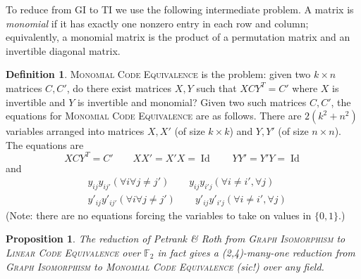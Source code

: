 \documentclass[10pt,a4paper]{article}
\newtheorem{proposition}[theorem]{Proposition}
\theoremstyle{definition}
\newtheorem{definition}[theorem]{Definition}
\DeclareMathOperator{\Id}{Id}
\newcommand{\F}{\mathbb{F}}
\begin{document}
To reduce from \textsc{GI} to \textsc{TI} we use the following intermediate problem. A matrix is \emph{monomial} if it has exactly one nonzero entry in each row and column; equivalently, a monomial matrix is the product of a permutation matrix and an invertible diagonal matrix. 

\begin{definition}
\textsc{Monomial Code Equivalence} is the problem: given two $k \times n$ matrices $C,C'$, do there exist matrices $X,Y$ such that $XCY^T = C'$ where $X$ is invertible and $Y$ is invertible and monomial? Given two such matrices $C,C'$, the equations for \textsc{Monomial Code Equivalence} are as follows. There are $2(k^2 + n^2)$ variables arranged into matrices $X,X'$ (of size $k \times k$) and $Y,Y'$ (of size $n \times n$). The equations are
\[
XCY^T = C' \qquad XX' = X'X =\Id \qquad YY' = Y'Y = \Id
\]
and
\begin{align*}
& y_{ij}y_{ij'} (\forall i \forall j \neq j') \qquad y_{ij} y_{i'j} (\forall i \neq i', \forall j) \\
& y'_{ij}y'_{ij'} (\forall i \forall j \neq j') \qquad y'_{ij} y'_{i'j} (\forall i \neq i', \forall j) 
\end{align*}
(Note: there are no equations forcing the variables to take on values in $\{0,1\}$.)
\end{definition}


\begin{proposition} \label{prop:GIMon}
The reduction of Petrank \& Roth \cite{PR} from \textsc{Graph Isomorphism} to \textsc{Linear Code Equivalence} over $\F_2$ in fact gives a (2,4)-many-one reduction from \textsc{Graph Isomorphism} to \textsc{Monomial Code Equivalence} (sic!) over any field.
\end{proposition}
\end{document}
